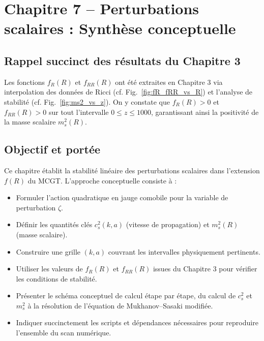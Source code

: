 \section{Chapitre 7 – Perturbations scalaires : Synthèse conceptuelle}

\subsection{Rappel succinct des résultats du Chapitre 3}
Les fonctions \(f_{R}(R)\) et \(f_{RR}(R)\) ont été extraites en Chapitre 3 via interpolation des données de Ricci (cf. Fig.~\ref{fig:fR_fRR_vs_R}) et l’analyse de stabilité (cf. Fig.~\ref{fig:ms2_vs_z}).  
On y constate que \(f_{R}(R)>0\) et \(f_{RR}(R)>0\) sur tout l’intervalle \(0\le z\le1000\), garantissant ainsi la positivité de la masse scalaire \(m_{s}^{2}(R)\).

\subsection{Objectif et portée}
Ce chapitre établit la stabilité linéaire des perturbations scalaires dans l’extension \(f(R)\) du MCGT. L’approche conceptuelle consiste à :
\begin{itemize}
  \item Formuler l’action quadratique en jauge comobile pour la variable de perturbation \(\zeta\).
  \item Définir les quantités clés \(c_{s}^{2}(k,a)\) (vitesse de propagation) et \(m_{s}^{2}(R)\) (masse scalaire).
  \item Construire une grille \((k,a)\) couvrant les intervalles physiquement pertinents.
  \item Utiliser les valeurs de \(f_{R}(R)\) et \(f_{RR}(R)\) issues du Chapitre 3 pour vérifier les conditions de stabilité.
  \item Présenter le schéma conceptuel de calcul étape par étape, du calcul de \(c_{s}^{2}\) et \(m_{s}^{2}\) à la résolution de l’équation de Mukhanov–Sasaki modifiée.
  \item Indiquer succinctement les scripts et dépendances nécessaires pour reproduire l’ensemble du scan numérique.
\end{itemize}

